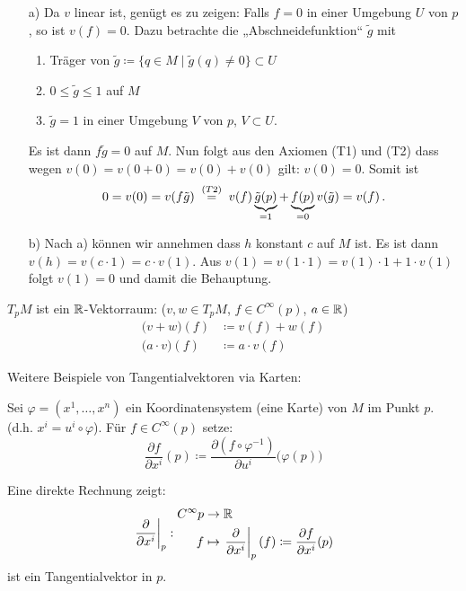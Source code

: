 \documentclass[a4paper,twoside,DIV15,BCOR12mm]{scrbook}
\renewcommand{\da}{\coloneqq}
\begin{document}
\begin{beweis}
\begin{itemize}
\item[a)] Da $v$ linear ist, genügt es zu zeigen: Falls $f=0$ in einer Umgebung $U$ von $p$, so ist $v(f)=0$. Dazu betrachte die „Abschneidefunktion“ $\tilde g$ mit 
\begin{enumerate}
\item Träger von $\tilde g \da \{ q\in M \mid \tilde g(q) \ne 0\} \subset U$
\item $0\le \tilde g \le 1$ auf $M$
\item $\tilde g = 1$ in einer Umgebung $V$ von $p$, $V \subset U$.
\end{enumerate}
Es ist dann $f\tilde g = 0$ auf $M$. Nun folgt aus den Axiomen (T1) und (T2) dass wegen $v(0)= v(0+0) = v(0) + v(0)$ gilt: $v(0)=0$. Somit ist
\[
0 = v(0) = v(f\tilde g) \gleichwegen{(T2)} v(f)\underbrace{\tilde g(p)}_{=1} + \underbrace{f(p)}_{=0}v(\tilde g) = v(f)\,.
\]
\item[b)] Nach a) können wir annehmen dass $h$ konstant $c$ auf $M$ ist. Es ist dann $v(h)= v(c\cdot1) = c\cdot v(1)$. Aus $v(1) = v(1\cdot 1) = v(1)\cdot 1 + 1\cdot v(1)$ folgt $v(1)=0$ und damit die Behauptung.
\end{itemize}
\end{beweis}

$T_pM$ ist ein $\mathbb{R}$-Vektorraum: ($v,w \in T_pM$, $f\in C^\infty(p)$, $a\in\mathbb{R}$)
\begin{align*}
\bigl(v + w\bigr)(f) &\da v(f) + w(f) \\
\bigl(a\cdot v\bigr)(f)   &\da a\cdot v(f) 
\end{align*}


Weitere Beispiele von Tangentialvektoren via Karten:
\newcommand{\ptv}[1]{\left.\frac{\partial}{\partial x^{#1}}\right|_p}

Sei $\varphi=(x^1,\ldots,x^n)$ ein Koordinatensystem (eine Karte) von $M$ im Punkt $p$. (d.h. $x^i=u^i\circ\varphi$). Für $f\in C^{\infty}(p)$ setze:
\[
\frac{\partial f}{\partial x^i}(p) \da \frac{\partial (f\circ \varphi^{-1})}{\partial u^i}\bigl(\varphi(p)\bigr) %
\]

Eine direkte Rechnung zeigt:
\[
\ptv{i}:
\begin{aligned}
C^\infty{p} &\to \MdR \\
f &\mapsto \ptv{i}(f) \da \frac{\partial f}{\partial x^i}(p)
\end{aligned}
\]
ist ein Tangentialvektor in $p$.
\end{document}
